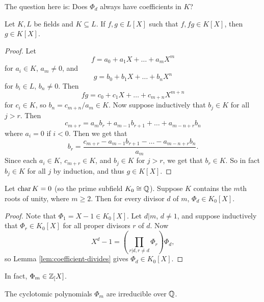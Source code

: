 \begin{remark}
  The question here is: Does $\Phi_d$ always have
  coefficients in $K$?
\end{remark}

\begin{lemma}
  \label{lem:coefficient-divides}
  Let $K, L$ be fields and $K \subseteq L$. If
  $f, g \in L[X]$ such that $f, fg \in K[X]$, then
  $g \in K[X]$.
\end{lemma}

\begin{proof}
  Let
  \[
    f = a_0 + a_1 X + \dots + a_m X^m
  \]
  for $a_i \in K$, $a_m \ne 0$, and
  \[
    g = b_0 + b_1 X + \dots + b_n X^n
  \]
  for $b_i \in L$, $b_n \ne 0$. Then
  \[
    fg = c_0 + c_1 X + \dots + c_{m + n} X^{m + n}
  \]
  for $c_i \in K$, so $b_n = c_{m + n} / a_m \in K$.
  Now suppose inductively that $b_j \in K$ for all
  $j > r$. Then
  \[
    c_{m + r} = a_m b_r + a_{m - 1} b_{r + 1} + \dots + a_{m - n + r} b_{n}
  \]
  where $a_i = 0$ if $i < 0$. Then we get that
  \[
    b_r = \frac{c_{m + r} - a_{m - 1} b_{r + 1} - \dots - a_{m - n + r} b_{n}}{a_m}.
  \]
  Since each $a_i \in K$, $c_{m + r} \in K$, and
  $b_j \in K$ for $j > r$, we get that $b_r \in K$.
  So in fact $b_j \in K$ for all $j$ by induction, and
  thus $g \in K[X]$.
\end{proof}

\begin{theorem}
  Let $\operatorname{char} K = 0$ (so the prime subfield
  $K_0 \cong \mathbb{Q}$). Suppose $K$ contains the $m$th roots of
  unity, where $m \ge 2$. Then for every divisor $d$
  of $m$, $\Phi_d \in K_0[X]$.
\end{theorem}

\begin{proof}
  Note that $\Phi_1 = X - 1 \in K_0[X]$. Let $d | m$,
  $d \ne 1$, and suppose inductively that
  $\Phi_r \in K_0[X]$ for all proper divisors $r$ of
  $d$. Now
  \[
    X^d - 1 = \left(\prod_{r | d, r \ne d} \Phi_r\right) \Phi_d,
  \]
  so Lemma \ref{lem:coefficient-divides} gives
  $\Phi_d \in K_0[X]$.
\end{proof}

\begin{remark}
  In fact, $\Phi_m \in \mathbb{Z}_[X]$.
\end{remark}

\begin{theorem}
  The cyclotomic polynomials $\Phi_m$ are irreducible
  over $\mathbb{Q}$.
\end{theorem}


